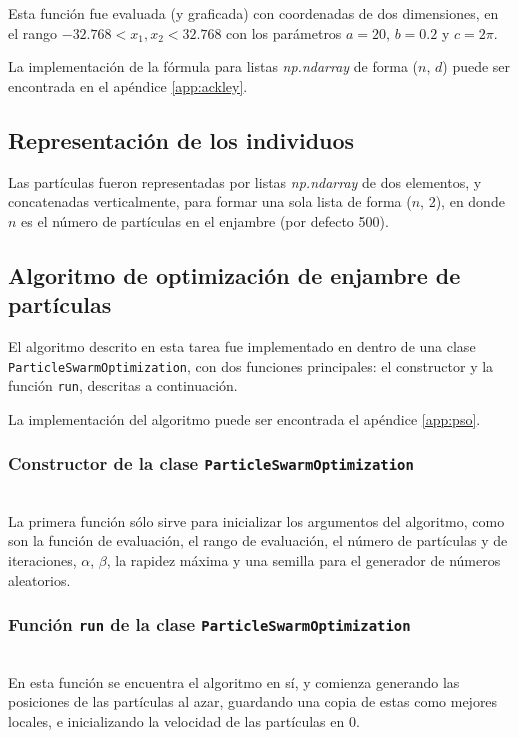 \documentclass[sigconf,authorversion,nonacm]{acmart}
\begin{document}
Esta función fue evaluada (y graficada) con coordenadas de dos dimensiones, en el rango $-32.768 < x_1, x_2 < 32.768$ con los parámetros $a = 20$, $b = 0.2$ y $c = 2\pi$.

La implementación de la fórmula para listas \textit{np.ndarray} de forma ($n$, $d$) puede ser encontrada en el apéndice \ref{app:ackley}.

\subsection{Representación de los individuos}
Las partículas fueron representadas por listas \textit{np.ndarray} de dos elementos, y concatenadas verticalmente, para formar una sola lista de forma ($n$, 2), en donde $n$ es el número de partículas en el enjambre (por defecto 500).

\subsection{Algoritmo de optimización de enjambre de partículas}
El algoritmo descrito en esta tarea fue implementado en dentro de una clase \texttt{ParticleSwarmOptimization}, con dos funciones principales: el constructor y la función \texttt{run}, descritas a continuación.

La implementación del algoritmo puede ser encontrada el apéndice \ref{app:pso}.

\subsubsection{Constructor de la clase \texttt{ParticleSwarmOptimization}}\hfill\\
La primera función sólo sirve para inicializar los argumentos del algoritmo, como son la función de evaluación, el rango de evaluación, el número de partículas y de iteraciones, $\alpha$, $\beta$, la rapidez máxima y una semilla para el generador de números aleatorios.

\subsubsection{Función \texttt{run} de la clase \texttt{ParticleSwarmOptimization}}\hfill\\
En esta función se encuentra el algoritmo en sí, y comienza generando las posiciones de las partículas al azar, guardando una copia de estas como mejores locales, e inicializando la velocidad de las partículas en 0.
\end{document}
